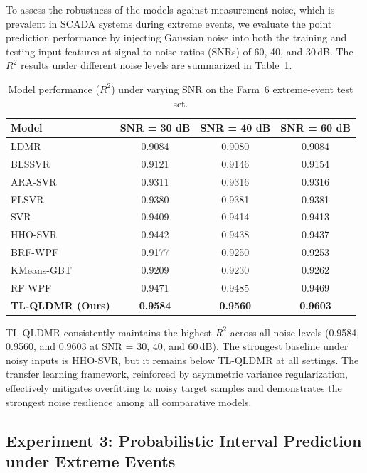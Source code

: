 \documentclass[a4paper]{cas-sc}
\begin{document}
To assess the robustness of the models against measurement noise, which is prevalent in SCADA systems during extreme events, we evaluate the point prediction performance by injecting Gaussian noise into both the training and testing input features at signal-to-noise ratios (SNRs) of 60, 40, and 30\,dB.
The $R^2$ results under different noise levels are summarized in Table~\ref{tab:exp2_noise}.

\begin{table}[ht]
\centering
\caption{Model performance ($R^2$) under varying SNR on the Farm~6 extreme-event test set.}
\setlength{\tabcolsep}{3.5mm}
\begin{tabular}{lccc}
\toprule
Model & SNR = 30 dB & SNR = 40 dB & SNR = 60 dB \\
\midrule
LDMR & 0.9084 & 0.9080 & 0.9084 \\
BLSSVR        & 0.9121 & 0.9146 & 0.9154 \\
ARA-SVR       & 0.9311 & 0.9316 & 0.9316 \\
FLSVR         & 0.9380 & 0.9381 & 0.9381 \\
SVR  & 0.9409 & 0.9414 & 0.9413 \\
HHO-SVR       & 0.9442 & 0.9438 & 0.9437 \\
BRF-WPF       & 0.9177 & 0.9250 & 0.9253 \\
KMeans-GBT    & 0.9209 & 0.9230 & 0.9262 \\
RF-WPF        & 0.9471 & 0.9485 & 0.9469 \\
\textbf{TL-QLDMR (Ours)} & \textbf{0.9584} & \textbf{0.9560} & \textbf{0.9603} \\
\bottomrule
\end{tabular}
\label{tab:exp2_noise}
\end{table}

TL-QLDMR consistently maintains the highest $R^2$ across all noise levels (0.9584, 0.9560, and 0.9603 at SNR = 30, 40, and 60\,dB). The strongest baseline under noisy inputs is HHO-SVR, but it remains below TL-QLDMR at all settings. The transfer learning framework, reinforced by asymmetric variance regularization, effectively mitigates overfitting to noisy target samples and demonstrates the strongest noise resilience among all comparative models.

\subsection{Experiment 3: Probabilistic Interval Prediction under Extreme Events}\label{sec:exp3}
\end{document}
